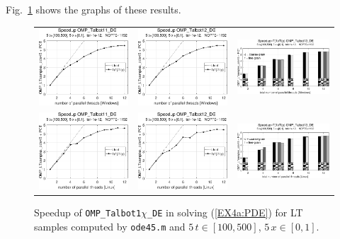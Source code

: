 \documentclass[a4paper,10pt]{report}%
\begin{document}
Fig.~\ref{PAR_EX4a_speedup_ode45} shows the graphs of these results.
\begin{figure}[htb]
\centering
\begin{tabular}{ccc} %
\includegraphics[height=0.2\textwidth]{./FIGS/EX4a/EX4a_ode45_speedup_11_5t_100_Windows.eps} &
\includegraphics[height=0.2\textwidth]{./FIGS/EX4a/EX4a_ode45_speedup_12_5t_100_Windows.eps} &
\includegraphics[height=0.2\textwidth,keepaspectratio=true]{./FIGS/EX4a/EX4a_ode45_speedup_13_5t_100_Windows.eps} \\
\includegraphics[height=0.2\textwidth]{./FIGS/EX4a/EX4a_ode45_speedup_11_5t_100_Linux.eps} &
\includegraphics[height=0.2\textwidth]{./FIGS/EX4a/EX4a_ode45_speedup_12_5t_100_Linux.eps} &
\includegraphics[height=0.2\textwidth,keepaspectratio=true]{./FIGS/EX4a/EX4a_ode45_speedup_13_5t_100_Linux.eps}
\end{tabular}
\caption{\small Speedup of {\tt OMP\_Talbot1$\chi$\_DE} in solving (\ref{EX4a:PDE}) for LT samples
computed by {\tt ode45.m} and $5\,t\in[100,500]$, $5\,x\in[0,1]$.}
\label{PAR_EX4a_speedup_ode45}
\end{figure}
\end{document}
